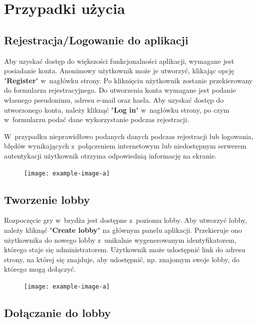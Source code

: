 \FloatBarrier

\section{Przypadki użycia}

\subsection{Rejestracja/Logowanie do aplikacji}

Aby uzyskać dostęp do większości funkcjonalności aplikacji, wymagane
jest posiadanie konta. Anonimowy użytkownik może je utworzyć, klikając
opcję "\textbf{Register}" w~nagłówku strony. Po kliknięciu użytkownik
zostanie przekierowany do formularza rejestracyjnego.
Do utworzenia konta wymagane jest podanie własnego
pseudonimu, adresu e-mail oraz hasła. Aby uzyskać dostęp do utworzonego
konta, należy kliknąć "\textbf{Log in}" w~nagłówku strony, po czym
w~formularzu podać dane wykorzystanie podczas rejestracji.

W~przypadku nieprawidłowo podanych danych podczas rejestracji
lub logowania, błędów wynikających z~połączeniem internetowym lub
niedostępnym serwerem autentykacji użytkownik otrzyma odpowiednią
informację na ekranie.

\begin{figure}[h]
  \centering
  \texttt{[image: example-image-a]}
  \caption{}
\end{figure}

\FloatBarrier

\subsection{Tworzenie lobby}

Rozpoczęcie gry w~brydża jest dostępne z~poziomu lobby. Aby utworzyć
lobby, należy kliknąć "\textbf{Create lobby}" na głównym panelu
aplikacji. Przekieruje ono użytkownika do nowego lobby
z~unikalnie wygenerowanym identyfikatorem, którego staje
się administratorem. Użytkownik może udostępnić link do adresu strony,
na której się znajduje, aby udostępnić, np. znajomym swoje lobby, do
którego mogą dołączyć.


\begin{figure}[h]
  \centering
  \texttt{[image: example-image-a]}
  \caption{}
\end{figure}

\FloatBarrier

\subsection{Dołączanie do lobby}

